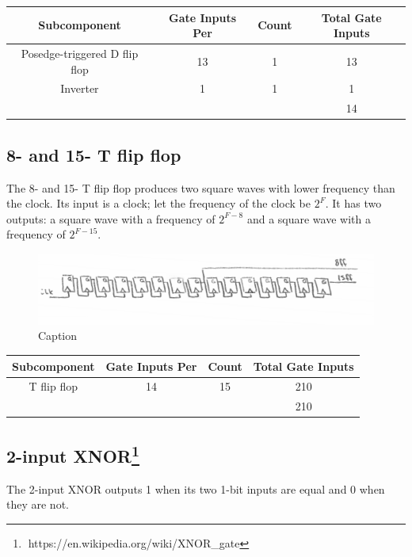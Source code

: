 \documentclass{article}
\begin{document}
\begin{center}
\begin{tabular}{ ccc|c }
 \textbf{Subcomponent} & \textbf{Gate Inputs Per} & \textbf{Count} & \textbf{Total Gate Inputs} \\
 \hline
 Posedge-triggered D flip flop & 13 & 1 & 13 \\
 Inverter & 1 & 1 & 1 \\
 \hline
 &&& 14\\
\end{tabular}
\end{center}

\newpage

\subsection{8- and 15- T flip flop}
The 8- and 15- T flip flop produces two square waves with lower frequency than the clock. Its input is a clock; let the frequency of the clock be $2^F$. It has two outputs: a square wave with a frequency of $2^{F-8}$ and a square wave with a frequency of $2^{F-15}$. \\

\begin{figure}[!ht]
\centering
\includegraphics[width=\textwidth]{img/8-15-ff}
\caption{Caption}
\label{fig:8-15-ff}
\end{figure}

\begin{center}
\begin{tabular}{ ccc|c }
 \textbf{Subcomponent} & \textbf{Gate Inputs Per} & \textbf{Count} & \textbf{Total Gate Inputs} \\
 \hline
 T flip flop & 14 & 15 & 210 \\
 \hline
 &&& 210\\
\end{tabular}
\end{center}

\subsection{2-input XNOR\footnote{$\;$https://en.wikipedia.org/wiki/XNOR\_gate}}
The 2-input XNOR outputs 1 when its two 1-bit inputs are equal and 0 when they are not. \\
\end{document}
